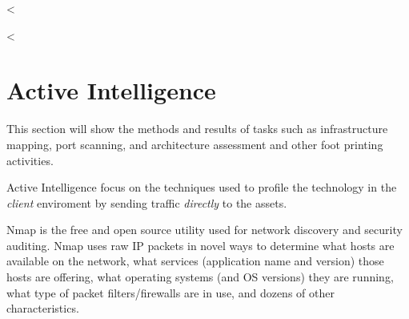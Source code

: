   <%

  <%

  \section {Active Intelligence}\label{sec:activeint}

    This section will show the methods and results of tasks such as
    infrastructure mapping, port scanning, and architecture assessment and other
    foot printing activities.

    Active Intelligence focus on the techniques used to profile the technology
    in the \textit{client} enviroment by sending traffic \textit{directly} to
    the assets.

    Nmap is the free and open source utility used for network discovery and
    security auditing. Nmap uses raw IP packets in novel ways to determine what
    hosts are available on the network, what services (application name and
    version) those hosts are offering, what operating systems (and OS versions)
    they are running, what type of packet filters/firewalls are in use, and
    dozens of other characteristics.

